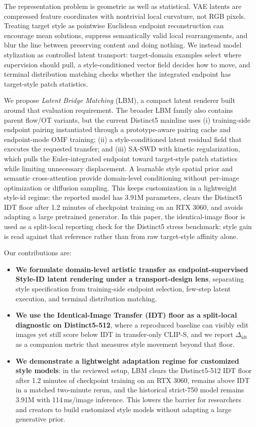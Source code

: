 \documentclass[letterpaper]{article}
\begin{document}
The representation problem is geometric as well as statistical. VAE latents are compressed feature coordinates with nontrivial local curvature, not RGB pixels. Treating target style as pointwise Euclidean endpoint reconstruction can encourage mean solutions, suppress semantically valid local rearrangements, and blur the line between preserving content and doing nothing. We instead model stylization as controlled latent transport: target-domain examples select where supervision should pull, a style-conditioned vector field decides how to move, and terminal distribution matching checks whether the integrated endpoint has target-style patch statistics.

We propose \emph{Latent Bridge Matching} (LBM), a compact latent renderer built around that evaluation requirement. The broader LBM family also contains parent flow/OT variants, but the current Distinct5 mainline uses (i) training-side endpoint pairing instantiated through a prototype-aware pairing cache and endpoint-mode OMF training; (ii) a style-conditioned latent residual field that executes the requested transfer; and (iii) SA-SWD with kinetic regularization, which pulls the Euler-integrated endpoint toward target-style patch statistics while limiting unnecessary displacement. A learnable style spatial prior and semantic cross-attention provide domain-level conditioning without per-image optimization or diffusion sampling. This keeps customization in a lightweight style-id regime: the reported model has 3.91M parameters, clears the Distinct5 IDT floor after 1.2 minutes of checkpoint training on an RTX 3060, and avoids adapting a large pretrained generator. In this paper, the identical-image floor is used as a split-local reporting check for the Distinct5 stress benchmark: style gain is read against that reference rather than from raw target-style affinity alone.

Our contributions are:
\begin{itemize}
    \item \textbf{We formulate domain-level artistic transfer as endpoint-supervised Style-ID latent rendering under a transport-design lens}, separating style specification from training-side endpoint selection, few-step latent execution, and terminal distribution matching.
    \item \textbf{We use the Identical-Image Transfer (IDT) floor as a split-local diagnostic on Distinct5-512}, where a reproduced baseline can visibly edit images yet still score below IDT in transfer-only CLIP-S, and we report $\Delta_{\mathrm{idt}}$ as a companion metric that measures style movement beyond that floor.
    \item \textbf{We demonstrate a lightweight adaptation regime for customized style models}: in the reviewed setup, LBM clears the Distinct5-512 IDT floor after 1.2 minutes of checkpoint training on an RTX 3060, remains above IDT in a matched two-minute rerun, and the historical strict-750 model remains 3.91M with 114\,ms/image inference. This lowers the barrier for researchers and creators to build customized style models without adapting a large generative prior.
\end{itemize}
\end{document}
